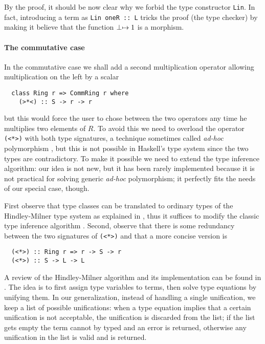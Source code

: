 By the proof, it should be now clear why we forbid the type
constructor \lstinline{Lin}. In fact, introducing a term as
\lstinline{Lin oneR :: L} tricks the proof (the type checker) by
making it believe that the function $\perp\mapsto 1$ is a morphism.


\paragraph{The commutative case}
\label{sec:commutative-case}
In the commutative case we shall add a second multiplication operator
allowing multiplication on the left by a scalar
\begin{lstlisting}
  class Ring r => CommRing r where
    (>*<) :: S -> r -> r 
\end{lstlisting}
but this would force the user to chose between the two operators any
time he multiplies two elements of $R$. To avoid this we need to
overload the operator \lstinline{(<*>)} with both type signatures, a
technique sometimes called \emph{ad-hoc} polymorphism
\cite{strachey00}, but this is not possible in Haskell's type system
since the two types are contradictory.  To make it possible we need to
extend the type inference algorithm: our idea is not new, but it has
been rarely implemented because it is not practical for solving
generic \emph{ad-hoc} polymorphism; it perfectly fits the needs of our
special case, though.

First observe that type classes can be translated to ordinary types of
the Hindley-Milner type system as explained in \cite[$\S
4$]{Walder+Blott-ad-hoc-polymorphism}, thus it suffices to modify the
classic type inference algorithm
\cite{Damas+Milner,Cardelli:Typechecking}. Second, observe that there
is some redundancy between the two signatures of \lstinline{(<*>)} and
that a more concise version is
\begin{lstlisting}
  (<*>) :: Ring r => r -> S -> r
  (<*>) :: S -> L -> L
\end{lstlisting}

A review of the Hindley-Milner algorithm and its implementation can be
found in \cite{Cardelli:Typechecking}. The idea is to first assign
type variables to terms, then solve type equations by unifying them.
In our generalization, instead of handling a single unification, we
keep a list of possible unifications: when a type equation implies
that a certain unification is not acceptable, the unification is
discarded from the list; if the list gets empty the term cannot by
typed and an error is returned, otherwise any unification in the list
is valid and is returned.

